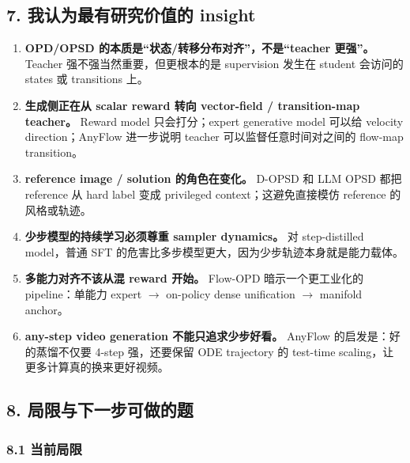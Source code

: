 \subsection{7. 我认为最有研究价值的 insight}

\begin{enumerate}[leftmargin=1.5em]
  \item \textbf{OPD/OPSD 的本质是“状态/转移分布对齐”，不是“teacher 更强”。} Teacher 强不强当然重要，但更根本的是 supervision 发生在 student 会访问的 states 或 transitions 上。
  \item \textbf{生成侧正在从 scalar reward 转向 vector-field / transition-map teacher。} Reward model 只会打分；expert generative model 可以给 velocity direction；AnyFlow 进一步说明 teacher 可以监督任意时间对之间的 flow-map transition。
  \item \textbf{reference image / solution 的角色在变化。} D-OPSD 和 LLM OPSD 都把 reference 从 hard label 变成 privileged context；这避免直接模仿 reference 的风格或轨迹。
  \item \textbf{少步模型的持续学习必须尊重 sampler dynamics。} 对 step-distilled model，普通 SFT 的危害比多步模型更大，因为少步轨迹本身就是能力载体。
  \item \textbf{多能力对齐不该从混 reward 开始。} Flow-OPD 暗示一个更工业化的 pipeline：单能力 expert $\rightarrow$ on-policy dense unification $\rightarrow$ manifold anchor。
  \item \textbf{any-step video generation 不能只追求少步好看。} AnyFlow 的启发是：好的蒸馏不仅要 4-step 强，还要保留 ODE trajectory 的 test-time scaling，让更多计算真的换来更好视频。
\end{enumerate}

\subsection{8. 局限与下一步可做的题}

\subsubsection{8.1 当前局限}


